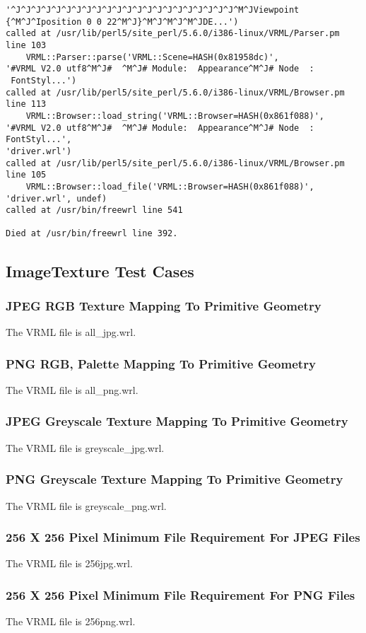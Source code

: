 \documentclass[12pt,letterpaper]{article}
\newcommand{\ITA}{JPEG RGB Texture Mapping To Primitive Geometry}
\newcommand{\ITB}{PNG RGB, Palette Mapping To Primitive Geometry}
\newcommand{\ITC}{JPEG Greyscale Texture Mapping To Primitive Geometry}
\newcommand{\ITD}{PNG Greyscale Texture Mapping To Primitive Geometry}
\newcommand{\ITE}{256 X 256 Pixel Minimum File Requirement For JPEG Files}
\newcommand{\ITF}{256 X 256 Pixel Minimum File Requirement For PNG Files}
\begin{document}
\begin{verbatim}
'^J^J^J^J^J^J^J^J^J^J^J^J^J^J^J^J^J^J^J^J^J^J^M^JViewpoint
{^M^J^Iposition 0 0 22^M^J}^M^J^M^J^M^JDE...')
called at /usr/lib/perl5/site_perl/5.6.0/i386-linux/VRML/Parser.pm
line 103
	VRML::Parser::parse('VRML::Scene=HASH(0x81958dc)',
'#VRML V2.0 utf8^M^J#  ^M^J# Module:  Appearance^M^J# Node  :
 FontStyl...')
called at /usr/lib/perl5/site_perl/5.6.0/i386-linux/VRML/Browser.pm
line 113
	VRML::Browser::load_string('VRML::Browser=HASH(0x861f088)',
'#VRML V2.0 utf8^M^J#  ^M^J# Module:  Appearance^M^J# Node  : 
FontStyl...',
'driver.wrl')
called at /usr/lib/perl5/site_perl/5.6.0/i386-linux/VRML/Browser.pm
line 105
	VRML::Browser::load_file('VRML::Browser=HASH(0x861f088)',
'driver.wrl', undef)
called at /usr/bin/freewrl line 541

Died at /usr/bin/freewrl line 392.

\end{verbatim}

\subsection{ImageTexture Test Cases}

\subsubsection{\ITA}
\label{sec:jpeg-rgb}
The VRML file is all\_jpg.wrl.

\subsubsection{\ITB}
The VRML file is all\_png.wrl.

\subsubsection{\ITC}
The VRML file is greyscale\_jpg.wrl.

\subsubsection{\ITD}
The VRML file is greyscale\_png.wrl.

\subsubsection{\ITE}
The VRML file is 256jpg.wrl.

\subsubsection{\ITF}
The VRML file is 256png.wrl.
\end{document}
